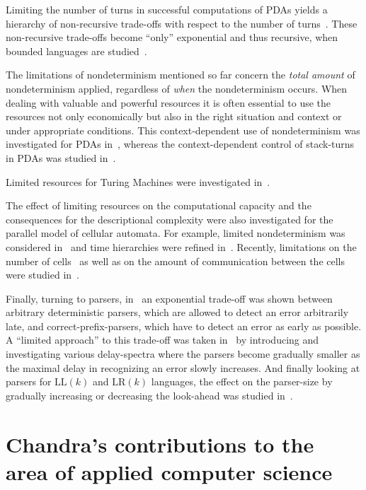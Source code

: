 \documentclass[copyright]{eptcs}
\begin{document}
Limiting the number of turns in successful computations of PDAs yields a hierarchy of non-recursive trade-offs with respect to the
number of turns~\cite{Malcher07}. These non-recursive trade-offs become ``only'' exponential and thus recursive, when bounded languages
are studied~\cite{MalcherP07}.

The limitations of nondeterminism mentioned so far concern the \emph{total amount} of nondeterminism applied, 
regardless of \emph{when} the nondeterminism occurs. When dealing with valuable and powerful resources it is often 
essential to use the resources not only economically but also in the
right situation and context or under appropriate conditions. This context-dependent use of nondeterminism was 
investigated for PDAs in~\cite{KutribM07a,KutribMW09,Masopust09},
whereas the context-dependent control of stack-turns in PDAs was studied in~\cite{KutribM07}. 

Limited resources for Turing Machines were investigated in~\cite{CaiC97,GoldsmithLM96,KleinK02,Kutrib02,Kutrib03}.

The effect of limiting resources on the computational capacity and the consequences for the descriptional complexity were also investigated
for the parallel model of cellular automata. For example, limited nondeterminism was considered in~\cite{BuchholzKK98,BuchholzKK02,BuchholzKK03}
and time hierarchies were refined in~\cite{BuchholzKK00,IwamotoHMI02}. Recently, limitations on the
number of cells~\cite{Malcher05,MalcherMP08} as well as on the amount of communication between the cells were studied in~\cite{KutribM09,KutribM09a}.

Finally, turning to parsers, in~\cite{GellerHSU77} an exponential trade-off was shown between arbitrary deterministic parsers, which are allowed to detect
an error arbitrarily late, and correct-prefix-parsers, which have to detect an error as early as possible. A ``limited approach'' to this trade-off 
was taken in~\cite{Fuessel92} by introducing and investigating various delay-spectra where the parsers become gradually smaller as the maximal delay 
in recognizing an error slowly increases. And finally looking at parsers for $\mathrm{LL}(k)$ and $\mathrm{LR}(k)$ languages, the effect on the 
parser-size by gradually increasing or decreasing the look-ahead was studied in~\cite{BertschN01,Blum01,LeungW00}.

\section{Chandra's contributions to the area of applied computer science}\label{s:practical}
\end{document}
